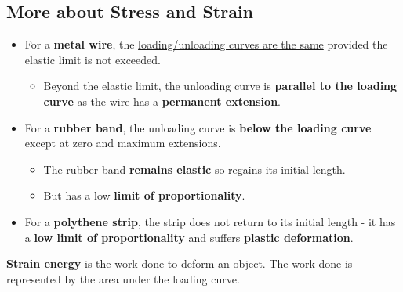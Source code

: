 \subsection{More about Stress and Strain}

\begin{itemize}
    \item For a \textbf{metal wire}, the \underline{loading/unloading curves are the same} provided the elastic limit is not exceeded.
        \begin{itemize}
            \item Beyond the elastic limit, the unloading curve is \textbf{parallel to the loading curve} as the wire has a \textbf{permanent extension}.
        \end{itemize}
    \item For a \textbf{rubber band}, the unloading curve is \textbf{below the loading curve} except at zero and maximum extensions.
        \begin{itemize}
            \item The rubber band \textbf{remains elastic} so regains its initial length.
            \item But has a low \textbf{limit of proportionality}.
        \end{itemize}
    \item For a \textbf{polythene strip}, the strip does not return to its initial length - it has a \textbf{low limit of proportionality} and suffers \textbf{plastic deformation}.
\end{itemize}

\textbf{Strain energy} is the work done to deform an object. The work done is represented by the area under the loading curve.
